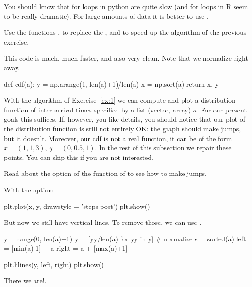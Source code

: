 You should know that for loops in python are quite slow (and for loops in R seem to be really dramatic). For large amounts of data it is better to use . 


\begin{exercise}\label{ex:1}
  Use the  functions , to replace the , and  to speed up the algorithm of the previous exercise. 
  \begin{solution}
    This code is much, much faster, and also very clean. Note that we normalize  right away. 
\begin{pyverbatim}
def cdf(a):
    y = np.arange(1, len(a)+1)/len(a)
    x = np.sort(a)
    return x, y
  
\end{pyverbatim}
  \end{solution}
\end{exercise}


With the algorithm of Exercise~\ref{ex:1} we can compute and plot a distribution function of inter-arrival times specified by a list (vector, array) $a$.
For our present goals this suffices.
If, however, you like details, you should notice that our plot of the distribution function is still not entirely OK: the graph should make jumps, but it doesn't.
Moreover, our cdf is not a real function, it can be of the form $x=(1,1,3)$, $y=(0, 0.5, 1)$.
In the rest of this subsection we repair these points.
You can skip this if you are not interested.

\begin{exercise}
Read about the  option of the  function of  to see how to make jumps.
  \begin{solution}
With the  option: 
\begin{pyverbatim}
plt.plot(x, y,  drawstyle = 'steps-post')
plt.show()
\end{pyverbatim}


But now we still have vertical lines. To remove those, we can use .

\begin{pyverbatim}
y = range(0, len(a)+1)
y = [yy/len(a) for yy in y] # normalize
s = sorted(a)
left = [min(a)-1] + a
right = a + [max(a)+1]

plt.hlines(y, left, right)
plt.show()
\end{pyverbatim}

There  we are!.
  \end{solution}
\end{exercise}


